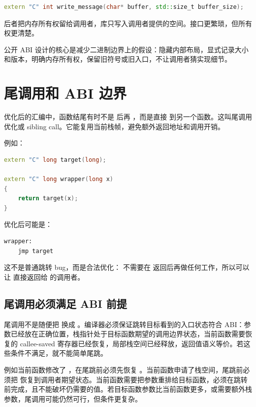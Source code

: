 \begin{lstlisting}[language=C++]
extern "C" int write_message(char* buffer, std::size_t buffer_size);
\end{lstlisting}

后者把内存所有权留给调用者，库只写入调用者提供的空间。接口更繁琐，但所有权更清楚。

\begin{keyidea}
公开 ABI 设计的核心是减少二进制边界上的假设：隐藏内部布局，显式记录大小和版本，明确内存所有权，保留旧符号或旧入口，不让调用者猜实现细节。
\end{keyidea}

\section{尾调用和 ABI 边界}

优化后的汇编中，函数结尾有时不是  后再 ，而是直接  到另一个函数。这叫尾调用优化或 sibling call。它能复用当前栈帧，避免额外返回地址和调用开销。

例如：

\begin{lstlisting}[language=C++]
extern "C" long target(long);

extern "C" long wrapper(long x)
{
    return target(x);
}
\end{lstlisting}

优化后可能是：

\begin{lstlisting}
wrapper:
    jmp target
\end{lstlisting}

这不是普通跳转 bug，而是合法优化： 不需要在  返回后再做任何工作，所以可以让  直接返回给  的调用者。

\subsection{尾调用必须满足 ABI 前提}

尾调用不是随便把  换成 。编译器必须保证跳转目标看到的入口状态符合 ABI：参数已经放在正确位置，栈指针处于目标函数期望的调用边界状态，当前函数需要恢复的 callee-saved 寄存器已经恢复，局部栈空间已经释放，返回值语义等价。若这些条件不满足，就不能简单尾跳。

例如当前函数修改了 ，在尾跳前必须先恢复 。当前函数申请了栈空间，尾跳前必须把  恢复到调用者期望状态。当前函数需要把参数重排给目标函数，必须在跳转前完成，且不能破坏仍需要的值。若目标函数参数比当前函数更多，或需要额外栈参数，尾调用可能仍然可行，但条件更复杂。

